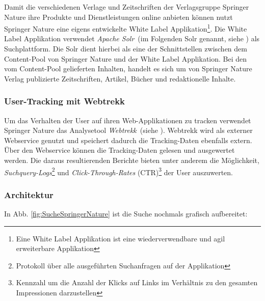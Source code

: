 Damit die verschiedenen Verlage und Zeitschriften der Verlagsgruppe Springer Nature ihre Produkte und Dienstleistungen online anbieten können nutzt Springer Nature eine eigens entwickelte White Label Applikation\footnote{Eine White Label Applikation ist eine wiederverwendbare und agil erweiterbare Applikation}. Die White Label Applikation verwendet \textit{Apache Solr}~(im Folgenden \glqq Solr\grqq{} genannt, siehe \cite{solr}) als Suchplattform. Die Solr dient hierbei als eine der Schnittstellen zwischen dem Content-Pool von Springer Nature und der White Label Applikation. Bei den vom Content-Pool gelieferten Inhalten, handelt es sich um von Springer Nature Verlag publizierte Zeitschriften, Artikel, Bücher und redaktionelle Inhalte.

\subsubsection{User-Tracking mit Webtrekk}
\label{sec:Einfuehrung:AufbauSucheBeiSpringerNature:Webtrekk}

Um das Verhalten der User auf ihren Web-Applikationen zu tracken verwendet Springer Nature das Analysetool \textit{Webtrekk}~(siehe \cite{webtrekk}). Webtrekk wird als externer Webservice genutzt und speichert dadurch die Tracking-Daten ebenfalls extern. Über den Webservice können die Tracking-Daten gelesen und ausgewertet werden. Die daraus resultierenden Berichte bieten unter anderem die Möglichkeit, \textit{Suchquery-Logs}\footnote{Protokoll über alle ausgeführten Suchanfragen auf der Applikation} und \textit{Click-Through-Rates} (CTR)\footnote{Kennzahl um die Anzahl der Klicks auf Links im Verhältnis zu den gesamten Impressionen darzustellen} der User auszuwerten.

\pagebreak

\subsubsection{Architektur}
\label{sec:Einfuehrung:AufbauSucheBeiSpringerNature:Architektur}

In Abb. \ref{fig:SucheSpringerNature} ist die Suche nochmals grafisch aufbereitet:

